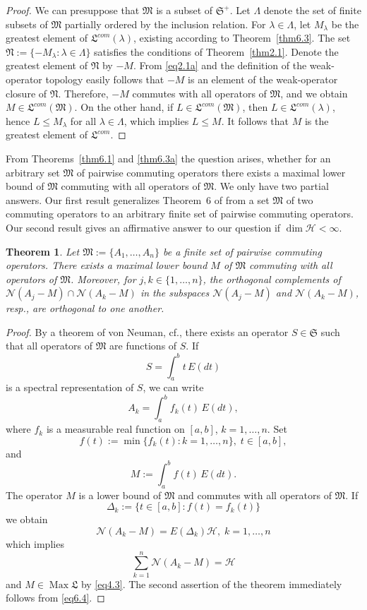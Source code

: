 \documentclass[12pt, a4paper, reqno, twoside]{amsart}
\numberwithin{equation}{section}
\DeclareMathOperator{\Max}{Max}
\newcommand{\frakS}{\mathfrak S}
\newcommand{\frakL}{\mathfrak L}
\newcommand{\frakM}{\mathfrak M}
\newcommand{\frakN}{\mathfrak N}
\newcommand{\cf}{\mbox{cf.}\xspace}
\newtheorem{theorem}{Theorem}[section]
\theoremstyle{definition}
\theoremstyle{remark}
\theoremstyle{mystyle}
\begin{document}
\begin{proof}
We can presuppose that $\frakM$ is a subset of $\frakS^{+}$. Let
$\Lambda$ denote the set of finite subsets of $\frakM$ partially
ordered by the inclusion relation. For $\lambda\in\Lambda$, let
$M_{\lambda}$ be the greatest element of $\frakL^{com}(\lambda)$,
existing according to Theorem~\ref{thm6.3}. The set $\frakN:=\{-M_{\lambda}:\lambda\in\Lambda\}$ satisfies the
conditions of Theorem~\ref{thm2.1}. Denote the greatest element of
$\frakN$ by $-M$. From \eqref{eq2.1a} and the definition of the
weak-operator topology easily follows that $-M$ is an element of the
weak-operator closure of $\frakN$. Therefore, $-M$ commutes with all
operators of $\frakM$, and we obtain $M\in\frakL^{com}(\frakM)$.
On the other hand, if $L\in\frakL^{com}(\frakM)$, then 
$L\in\frakL^{com}(\lambda)$, hence $L\leq M_{\lambda}$ for all
$\lambda\in\Lambda$, which implies $L\leq M$. It follows that $M$ is
the greatest element of $\frakL^{com}$. 
\end{proof}


From Theorems~\ref{thm6.1} and \ref{thm6.3a} the question arises,
whether for an arbitrary set $\frakM$ of pairwise commuting
operators there exists a maximal lower bound of $\frakM$ commuting
with all operators of $\frakM$. We only have two partial answers.
Our first result generalizes Theorem~6 of \cite{Aslanov2005} from a
set $\frakM$ of two commuting operators to an arbitrary finite set of
pairwise commuting operators. Our second result gives an affirmative
answer to our question if $\dim\mathscr H < \infty$.

\begin{theorem}
\label{thm6.4}
Let $\frakM:=\{A_{1},\ldots,A_{n}\}$ be a finite set of pairwise
commuting operators. There exists a maximal lower bound $M$ of
$\frakM$ commuting with all operators of $\frakM$.  Moreover, for
$j,k\in\{1,\ldots,n\}$, the orthogonal complements of $\mathscr
N(A_{j}-M)\cap\mathscr N(A_{k}-M)$ in the subspaces $\mathscr
N(A_{j}-M)$
and $\mathscr N(A_{k}-M)$, resp., are orthogonal to one another.
\end{theorem}

\begin{proof}
By a theorem of von Neuman, \cf \cite[Nr.~130]{RieszNagy1973}, there
exists an operator $S\in\frakS$ such that all operators of $\frakM$
are functions of $S$. If
\[
  S = \int_{a}^{b} t\,E(dt)
\]
is a spectral representation of $S$, we can write
\[
   A_{k} = \int_{a}^{b} f_{k}(t)\,E(dt), 
\]
where $f_{k}$ is a measurable real function on $[a,b]$,
$k=1,\ldots,n$. Set
\[
  f(t):=\min\bigl\{f_{k}(t): k=1,\ldots,n\bigr\},\;t\in[a,b],
\]
and
\[
  M:=\int_{a}^{b} f(t)\,E(dt).
\]
The operator $M$ is a lower bound of $\frakM$ and commutes with all
operators of $\frakM$. If
\[
  \Delta_{k}:=\bigl\{t\in[a,b] : f(t)=f_{k}(t)\bigr\}
\]
we obtain
\begin{equation}
\label{eq6.4}
\mathscr N(A_{k}-M) = E(\Delta_{k})\mathscr H, \;k=1,\ldots,n  
\end{equation}
which implies
\[
  \sum_{k=1}^{n}\mathscr N(A_{k}-M)=\mathscr H
\]
and $M\in\Max\frakL$ by \eqref{eq4.3}. The second assertion of the
theorem immediately follows from \eqref{eq6.4}.
\end{proof}
\end{document}
